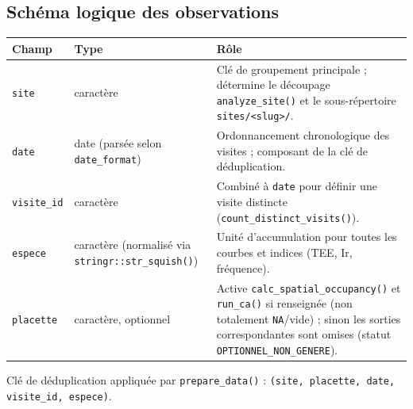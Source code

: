 \documentclass[11pt,a4paper]{article}
\begin{document}
\subsection{Schéma logique des observations}
\begin{longtable}{|p{2.4cm}|p{2.6cm}|p{9.3cm}|}
\hline
\textbf{Champ} & \textbf{Type} & \textbf{Rôle} \\
\hline
\texttt{site} & caractère & Clé de groupement principale ; détermine le découpage \texttt{analyze\_site()} et le sous-répertoire \texttt{sites/<slug>/}. \\
\hline
\texttt{date} & date (parsée selon \texttt{date\_format}) & Ordonnancement chronologique des visites ; composant de la clé de déduplication. \\
\hline
\texttt{visite\_id} & caractère & Combiné à \texttt{date} pour définir une visite distincte (\texttt{count\_distinct\_visits()}). \\
\hline
\texttt{espece} & caractère (normalisé via \texttt{stringr::str\_squish()}) & Unité d'accumulation pour toutes les courbes et indices (TEE, Ir, fréquence). \\
\hline
\texttt{placette} & caractère, optionnel & Active \texttt{calc\_spatial\_occupancy()} et \texttt{run\_ca()} si renseignée (non totalement \texttt{NA}/vide) ; sinon les sorties correspondantes sont omises (statut \texttt{OPTIONNEL\_NON\_GENERE}). \\
\hline
\end{longtable}

Clé de déduplication appliquée par \texttt{prepare\_data()} : \texttt{(site, placette, date, visite\_id, espece)}.
\end{document}
